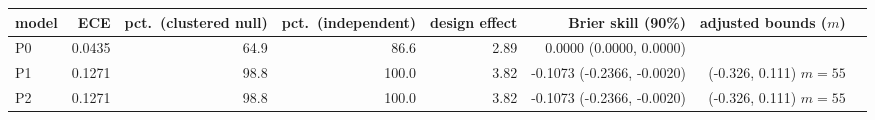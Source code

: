 \begin{tabular}{lrrrrrrr}
\toprule
model & ECE & pct.\ (clustered null) & pct.\ (independent) & design effect & Brier skill (90\%) & adjusted bounds ($m$) \\
\midrule
P0 & 0.0435 & 64.9 & 86.6 & 2.89 & 0.0000 (0.0000, 0.0000) &  \\
P1 & 0.1271 & 98.8 & 100.0 & 3.82 & -0.1073 (-0.2366, -0.0020) & (-0.326, 0.111) $m=55$ \\
P2 & 0.1271 & 98.8 & 100.0 & 3.82 & -0.1073 (-0.2366, -0.0020) & (-0.326, 0.111) $m=55$ \\
\bottomrule
\end{tabular}

